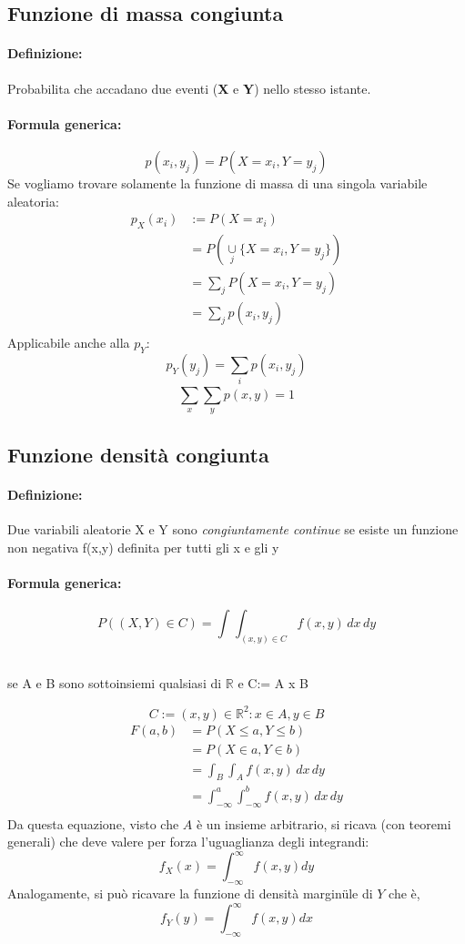 \documentclass[]{article}
\newcommand{\definizione}{\paragraph{Definizione:}}
\newcommand{\formula}{\paragraph{Formula generica:}}
\begin{document}
    \subsection{Funzione di massa congiunta}
    \definizione Probabilita che accadano due eventi (\textbf{X} e \textbf{Y}) nello stesso istante.
    \formula \[ p(x_i, y_j) = P(X=x_i, Y=y_j) \]
    Se vogliamo trovare solamente la funzione di massa di una singola variabile aleatoria:
    \begin{equation*}
        \begin{split}
            p_X(x_i) & := P(X = x_i) \\ 
            & = P(\underset{j}{\cup} \{ X=x_i, Y=y_j \}) \\
            & = \sum_{j}^{} P(X=x_i, Y=y_j) \\ 
            & = \sum_{j}^{} p(x_i, y_j) \\
        \end{split}
    \end{equation*}
    Applicabile anche alla $p_Y$:
    \[ p_Y(y_j) = \sum_{i}^{} p(x_i, y_j) \]
    \linebreak[4]
    \[ \sum_{x}^{} \sum_{y}^{} p(x, y) = 1 \]

    \newpage
    \subsection{Funzione densità congiunta}
    \definizione Due variabili aleatorie X e Y sono \textit{congiuntamente continue} se esiste un funzione non negativa f(x,y)
    definita per tutti gli x e gli y
    \formula
    \[ P((X,Y) \in C) = \int_{}^{} \int_{(x,y) \in C}^{} f(x,y) \, dx \, dy \] \\
    \centerline{se A e B sono sottoinsiemi qualsiasi di $\mathbb{R}$ e C:= A x B}
    \[ C:= {(x,y) \in \mathbb{R}^2 : x \in A, y \in B}\]
    \begin{equation*}
        \begin{split}
            F(a,b) & = P(X \leq a, Y \leq b) \\
            & = P(X \in a, Y \in b) \\
            & = \int_{B}^{} \int_{A}^{} f(x,y) \, dx \, dy \\
            & = \int_{-\infty}^{a} \int_{-\infty}^{b} f(x,y) \, dx \, dy \\
        \end{split}
    \end{equation*}
    Da questa equazione, visto che $A$ è un insieme arbitrario, si ricava (con teoremi generali) che deve valere per forza l'uguaglianza degli integrandi:
    $$
        f_X(x)=\int_{-\infty}^{\infty} f(x, y) d y
    $$
    Analogamente, si può ricavare la funzione di densità marginüle di $Y$ che è,
    $$
        f_Y(y)=\int_{-\infty}^{\infty} f(x, y) d x
    $$
\end{document}
